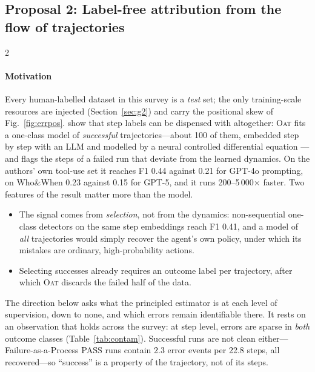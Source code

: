 \subsection{Proposal 2: Label-free attribution from the flow of trajectories}\label{sec:future:unsup}

\begin{multicols}{2}
\paragraph{Motivation} Every human-labelled dataset in this survey is a \emph{test} set; the only training-scale resources are injected (Section~\ref{sec:g2}) and carry the positional skew of Fig.~\ref{fig:errpos}. \citet{yeh2026oat} show that step labels can be dispensed with altogether: \textsc{Oat} fits a one-class model of \emph{successful} trajectories---about 100 of them, embedded step by step with an LLM and modelled by a neural controlled differential equation \cite{kidger2020ncde}---and flags the steps of a failed run that deviate from the learned dynamics. On the authors' own tool-use set it reaches F1 0.44 against 0.21 for GPT-4o prompting, on Who\&When 0.23 against 0.15 for GPT-5, and it runs 200--5\,000$\times$ faster. Two features of the result matter more than the model.
\begin{itemize}[leftmargin=1.1em]
\item The signal comes from \emph{selection}, not from the dynamics: non-sequential one-class detectors on the same step embeddings reach F1 0.41, and a model of \emph{all} trajectories would simply recover the agent's own policy, under which its mistakes are ordinary, high-probability actions.
\item Selecting successes already requires an outcome label per trajectory, after which \textsc{Oat} discards the failed half of the data.
\end{itemize}
The direction below asks what the principled estimator is at each level of supervision, down to none, and which errors remain identifiable there. It rests on an observation that holds across the survey: at step level, errors are sparse in \emph{both} outcome classes (Table~\ref{tab:contam}). Successful runs are not clean either---Failure-as-a-Process PASS runs contain 2.3 error events per 22.8 steps, all recovered---so ``success'' is a property of the trajectory, not of its steps.


\end{multicols}
